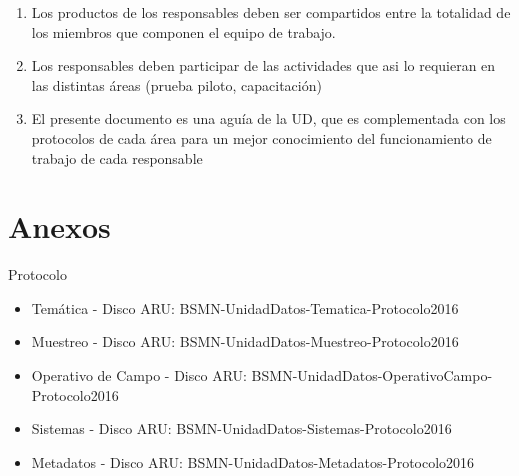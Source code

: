\documentclass{article}
\begin{document}
\begin{enumerate}
\item Los productos de los responsables deben ser compartidos entre la totalidad de los miembros que componen el equipo de trabajo.
\item Los responsables deben participar de las actividades que asi lo requieran en las distintas áreas (prueba piloto, capacitación)
\item El presente documento es una aguía de la UD, que es complementada con los protocolos de cada área para un mejor conocimiento del funcionamiento de trabajo de cada responsable
\end{enumerate}

\section{Anexos}
Protocolo
\begin{itemize}
\item Temática - Disco ARU: BSMN-UnidadDatos-Tematica-Protocolo2016
\item Muestreo - Disco ARU: BSMN-UnidadDatos-Muestreo-Protocolo2016
\item Operativo de Campo - Disco ARU: BSMN-UnidadDatos-OperativoCampo-Protocolo2016
\item Sistemas - Disco ARU: BSMN-UnidadDatos-Sistemas-Protocolo2016
\item Metadatos - Disco ARU: BSMN-UnidadDatos-Metadatos-Protocolo2016
\end{itemize}
\end{document}
